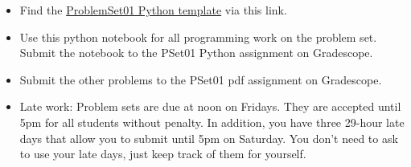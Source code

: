 \documentclass[12pt,letterpaper,noanswers]{exam}
\newcommand{\note}[1]{\textcolor{red}{[#1]}} %
\renewcommand{\note}[1]{} %
\begin{document}
 \pdfpageheight 11in 
  \pdfpagewidth 8.5in

\note{
\begin{enumerate}
\item numbers in computers
\begin{enumerate}
    \item convert integer or fraction or decimal to binary
    \item use the round to nearest rule
    \item truncation vs rounding
    \item do addition / subtraction with binary numbers
    \item identify the largest number (overflow)
    \item identify machine error
    \item what is machine error?
\end{enumerate}
\item condition number and numerical error: revisit this problem and look around a bit.
\item calculus review: taylor expansion?
\item python
\begin{enumerate}
    \item for loop example
    \item while loop example
    \item lists
    \item appending to lists
    \item numpy
    \item having a counter
    \item defining a function
    \item numpy arrays
    \item creating lists of random numbers
    \item plotting
\end{enumerate}
\end{enumerate}
}
\begin{itemize}
    \itemsep0pt
    \item Find the \href{https://github.com/sarah1123/ScientificComputing-APMTH111/tree/main/2023Fall/PythonFiles/01_floatingpoint}{ProblemSet01 Python template} via this link.
    \item Use this python notebook for all programming work on the problem set.  Submit the notebook to the PSet01 Python assignment on Gradescope.
    \item Submit the other problems to the PSet01 pdf assignment on Gradescope.
    \item Late work: Problem sets are due at noon on Fridays.  They are accepted until 5pm for all students without penalty.  In addition, you have three 29-hour late days that allow you to submit until 5pm on Saturday.  You don't need to ask to use your late days, just keep track of them for yourself.
\end{itemize}
\noindent 
  
\end{document}
